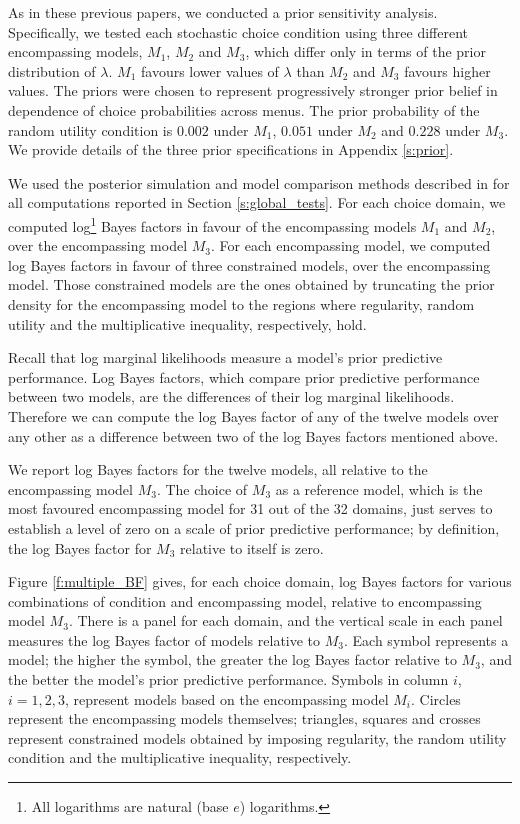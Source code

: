 \documentclass[11pt,letter]{article}
\newcommand{\menus}{menus}
\begin{document}
As in these previous papers, we conducted a prior sensitivity analysis.
Specifically, we tested each stochastic choice condition using three different encompassing models, $M_1$, $M_2$ and $M_3$, which differ only in terms of the prior distribution of $\lambda$.
$M_1$ favours lower values of $\lambda$ than $M_2$ and $M_3$ favours higher values.
The priors were chosen to represent progressively stronger prior belief in dependence of choice probabilities across \menus{}.
The prior probability of the random utility condition is $0.002$ under $M_1$, $0.051$ under $M_2$ and $0.228$ under $M_3$.
We provide details of the three prior specifications in Appendix \ref{s:prior}.

We used the posterior simulation and model comparison methods described in \citet{McCaMarl14} for all computations reported in Section \ref{s:global_tests}.
For each choice domain, we computed log\footnote{All logarithms are natural (base $e$) logarithms.} Bayes factors in favour of the encompassing models $M_1$ and $M_2$, over the encompassing model $M_3$.
For each encompassing model, we computed log Bayes factors in favour of three constrained models, over the encompassing model.
Those constrained models are the ones obtained by truncating the prior density for the encompassing model to the regions where regularity, random utility and the multiplicative inequality, respectively, hold.

Recall that log marginal likelihoods measure a model's prior predictive performance.
Log Bayes factors, which compare prior predictive performance between two models, are the differences of their log marginal likelihoods.
Therefore we can compute the log Bayes factor of any of the twelve models over any other as a difference between two of the log Bayes factors mentioned above.

We report log Bayes factors for the twelve models, all relative to the encompassing model $M_3$.
The choice of $M_3$ as a reference model, which is the most favoured encompassing model for 31 out of the 32 domains, just serves to establish a level of zero on a scale of prior predictive performance; by definition, the log Bayes factor for $M_3$ relative to itself is zero.

Figure \ref{f:multiple_BF} gives, for each choice domain, log Bayes factors for various combinations of condition and encompassing model, relative to encompassing model $M_3$.
There is a panel for each domain, and the vertical scale in each panel measures the log Bayes factor of models relative to $M_3$.
Each symbol represents a model; the higher the symbol, the greater the log Bayes factor relative to $M_3$, and the better the model's prior predictive performance.
Symbols in column $i$, $i=1,2,3$, represent models based on the encompassing model $M_i$.
Circles represent the encompassing models themselves; triangles, squares and crosses represent constrained models obtained by imposing regularity, the random utility condition and the multiplicative inequality, respectively.
\end{document}
